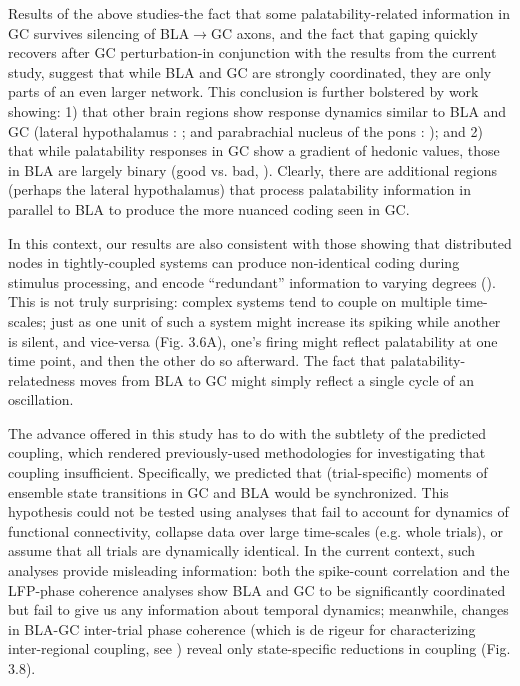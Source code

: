 \begin{refsection}
Results of the above studies-the fact that some palatability-related information in GC survives silencing of BLA$\rightarrow$GC axons, and the fact that gaping quickly recovers after GC perturbation-in conjunction with the results from the current study, suggest that while BLA and GC are strongly coordinated, they are only parts of an even larger network. This conclusion is further bolstered by work showing: 1) that other brain regions show response dynamics similar to BLA and GC (lateral hypothalamus : \cite{li2013a}; and parabrachial nucleus of the pons : \cite{baez-santiago2016a}); and 2) that while palatability responses in GC show a gradient of hedonic values, those in BLA are largely binary (good vs. bad, \cite{fontanini2009a,sadacca2012a}). Clearly, there are additional regions (perhaps the lateral hypothalamus) that process palatability information in parallel to BLA to produce the more nuanced coding seen in GC. 

In this context, our results are also consistent with those showing that distributed nodes in tightly-coupled systems can produce non-identical coding during stimulus processing, and encode “redundant” information to varying degrees (\cite{siegel2015a,brincat2018a,lara2018a,saravani2019a}). This is not truly surprising: complex systems tend to couple on multiple time-scales; just as one unit of such a system might increase its spiking while another is silent, and vice-versa (Fig. 3.6A), one’s firing might reflect palatability at one time point, and then the other do so afterward. The fact that palatability-relatedness moves from BLA to GC might simply reflect a single cycle of an oscillation.

The advance offered in this study has to do with the subtlety of the predicted coupling, which rendered previously-used methodologies for investigating that coupling insufficient. Specifically, we predicted that (trial-specific) moments of ensemble state transitions in GC and BLA would be synchronized. This hypothesis could not be tested using analyses that fail to account for dynamics of functional connectivity, collapse data over large time-scales (e.g. whole trials), or assume that all trials are dynamically identical. In the current context, such analyses provide misleading information: both the spike-count correlation and the LFP-phase coherence analyses show BLA and GC to be significantly coordinated but fail to give us any information about temporal dynamics; meanwhile, changes in BLA-GC inter-trial phase coherence (which is de rigeur for characterizing inter-regional coupling, see \cite{engel2020a,kramer2020a,zareian2020a,zielinski2019a}) reveal only state-specific reductions in coupling (Fig. 3.8).


\end{refsection}
